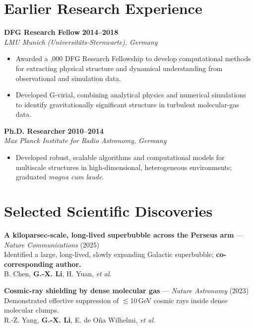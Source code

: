 \documentclass[10pt]{article}
\newcommand{\disc}[1]{{\fontsize{10.5}{12.6}\selectfont\textbf{#1}}}
\begin{document}
\newpage
\section*{Earlier Research Experience}

\textbf{DFG Research Fellow} \hfill \textbf{2014--2018}\\
\textit{LMU Munich (Universit\"ats-Sternwarte), Germany}\\
\begin{itemize}
  \item Awarded a ,000 DFG Research Fellowship to develop computational methods for
        extracting physical structure and dynamical understanding from observational and
        simulation data.
  \item Developed G-virial, combining analytical physics and numerical simulations to identify
        gravitationally significant structure in turbulent molecular-gas data.
\end{itemize}

\textbf{Ph.D. Researcher} \hfill \textbf{2010--2014}\\
\textit{Max Planck Institute for Radio Astronomy, Germany}\\
\begin{itemize}
  \item Developed robust, scalable algorithms and computational models for multiscale structures in
        high-dimensional, heterogeneous environments; graduated \textit{magna cum laude}.
\end{itemize}

\section*{Selected Scientific Discoveries}

\disc{A kiloparsec-scale, long-lived superbubble across the Perseus arm} --- \textit{Nature Communications} (2025)\\
Identified a large, long-lived, slowly expanding Galactic superbubble; \textbf{co-corresponding
author.}\\
B. Chen, \textbf{G.-X. Li}, H. Yuan, \textit{et al.}
\vspace{22pt}

\disc{Cosmic-ray shielding by dense molecular gas} --- \textit{Nature Astronomy} (2023)\\
Demonstrated effective suppression of $\lesssim$10\,GeV cosmic rays inside dense molecular clumps.\\
R.-Z. Yang, \textbf{G.-X. Li}, E. de O\~na Wilhelmi, \textit{et al.}
\vspace{22pt}
\end{document}
